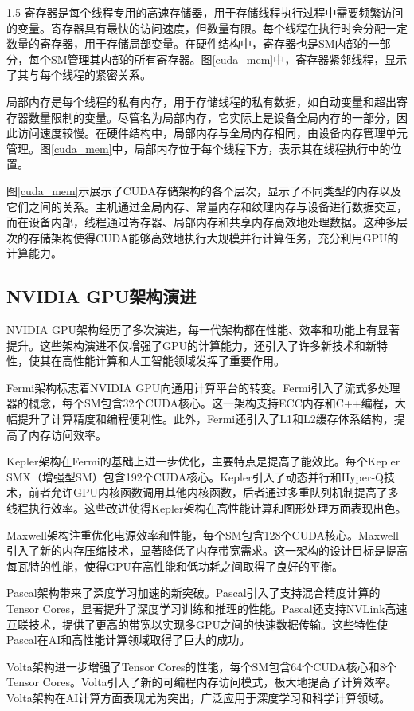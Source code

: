 \documentclass[zihao=-4]{ctexart}
\begin{document}
\begin{spacing}{1.5}
寄存器是每个线程专用的高速存储器，用于存储线程执行过程中需要频繁访问的变量。寄存器具有最快的访问速度，但数量有限。每个线程在执行时会分配一定数量的寄存器，用于存储局部变量。在硬件结构中，寄存器也是SM内部的一部分，每个SM管理其内部的所有寄存器。图\ref{cuda_mem}中，寄存器紧邻线程，显示了其与每个线程的紧密关系。

局部内存是每个线程的私有内存，用于存储线程的私有数据，如自动变量和超出寄存器数量限制的变量。尽管名为局部内存，它实际上是设备全局内存的一部分，因此访问速度较慢。在硬件结构中，局部内存与全局内存相同，由设备内存管理单元管理。图\ref{cuda_mem}中，局部内存位于每个线程下方，表示其在线程执行中的位置。

图\ref{cuda_mem}示展示了CUDA存储架构的各个层次，显示了不同类型的内存以及它们之间的关系。主机通过全局内存、常量内存和纹理内存与设备进行数据交互，而在设备内部，线程通过寄存器、局部内存和共享内存高效地处理数据。这种多层次的存储架构使得CUDA能够高效地执行大规模并行计算任务，充分利用GPU的计算能力。

\subsection{NVIDIA GPU架构演进}

NVIDIA GPU架构经历了多次演进，每一代架构都在性能、效率和功能上有显著提升。这些架构演进不仅增强了GPU的计算能力，还引入了许多新技术和新特性，使其在高性能计算和人工智能领域发挥了重要作用。

Fermi架构标志着NVIDIA GPU向通用计算平台的转变。Fermi引入了流式多处理器的概念，每个SM包含32个CUDA核心。这一架构支持ECC内存和C++编程，大幅提升了计算精度和编程便利性。此外，Fermi还引入了L1和L2缓存体系结构，提高了内存访问效率。

Kepler架构在Fermi的基础上进一步优化，主要特点是提高了能效比。每个Kepler SMX（增强型SM）包含192个CUDA核心。Kepler引入了动态并行和Hyper-Q技术，前者允许GPU内核函数调用其他内核函数，后者通过多重队列机制提高了多线程执行效率。这些改进使得Kepler架构在高性能计算和图形处理方面表现出色。

Maxwell架构注重优化电源效率和性能，每个SM包含128个CUDA核心。Maxwell引入了新的内存压缩技术，显著降低了内存带宽需求。这一架构的设计目标是提高每瓦特的性能，使得GPU在高性能和低功耗之间取得了良好的平衡。

Pascal架构带来了深度学习加速的新突破。Pascal引入了支持混合精度计算的Tensor Cores，显著提升了深度学习训练和推理的性能。Pascal还支持NVLink高速互联技术，提供了更高的带宽以实现多GPU之间的快速数据传输。这些特性使Pascal在AI和高性能计算领域取得了巨大的成功。

Volta架构进一步增强了Tensor Cores的性能，每个SM包含64个CUDA核心和8个Tensor Cores。Volta引入了新的可编程内存访问模式，极大地提高了计算效率。Volta架构在AI计算方面表现尤为突出，广泛应用于深度学习和科学计算领域。


\end{spacing}
\end{document}
